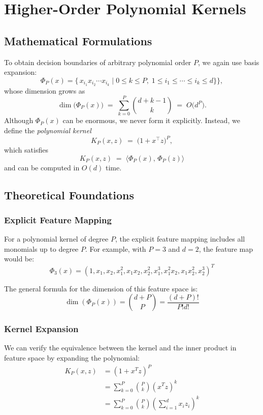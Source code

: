 \documentclass[11pt]{article}
\begin{document}
\section{Higher-Order Polynomial Kernels}

\subsection{Mathematical Formulations}
To obtain decision boundaries of arbitrary polynomial order $P$, we again use basis expansion:
\[
\Phi_P(x) = \bigl\{\,x_{i_1}x_{i_2}\cdots x_{i_k}\mid 0 \le k \le P,\;1\le i_1\le \cdots\le i_k\le d\}\bigr\},
\]
whose dimension grows as
\[
\dim\bigl(\Phi_P(x)\bigr) \;=\;\sum_{k=0}^P \binom{d + k - 1}{k}
\;=\;O\bigl(d^P\bigr).
\]
Although $\Phi_P(x)$ can be enormous, we never form it explicitly. Instead, we define the \emph{polynomial kernel}
\[
K_P(x,z) \;=\;\bigl(1 + x^\top z\bigr)^P,
\]
which satisfies
\[
K_P(x,z)\;=\;\langle \Phi_P(x),\,\Phi_P(z)\rangle
\]
and can be computed in $O(d)$ time.

\subsection{Theoretical Foundations}

\subsubsection{Explicit Feature Mapping}
For a polynomial kernel of degree $P$, the explicit feature mapping includes all monomials up to degree $P$. For example, with $P=3$ and $d=2$, the feature map would be:
\[
\Phi_3(x) = (1, x_1, x_2, x_1^2, x_1x_2, x_2^2, x_1^3, x_1^2x_2, x_1x_2^2, x_2^3)^T
\]

The general formula for the dimension of this feature space is:
\[
\dim(\Phi_P(x)) = \binom{d+P}{P} = \frac{(d+P)!}{P!d!}
\]

\subsubsection{Kernel Expansion}
We can verify the equivalence between the kernel and the inner product in feature space by expanding the polynomial:
\begin{align}
K_P(x,z) &= (1 + x^Tz)^P \\
&= \sum_{k=0}^P \binom{P}{k}(x^Tz)^k \\
&= \sum_{k=0}^P \binom{P}{k}\left(\sum_{i=1}^d x_i z_i\right)^k
\end{align}
\end{document}
